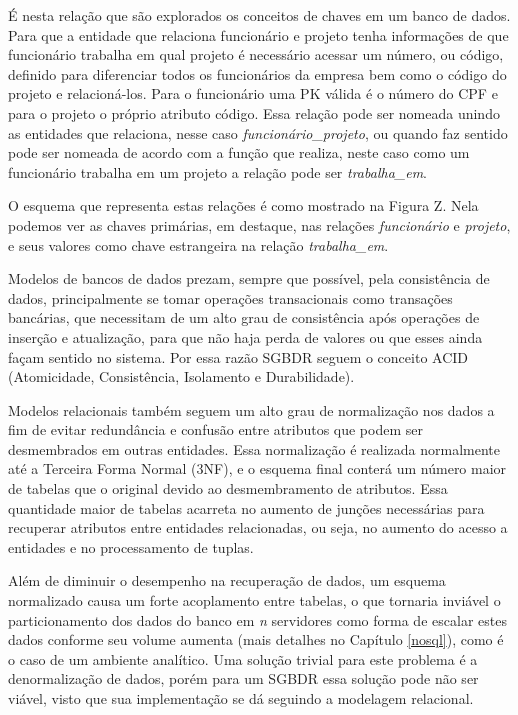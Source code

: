É nesta relação que são explorados os conceitos de chaves em um banco de dados. Para que a entidade que relaciona 
funcionário e projeto tenha informações de que funcionário trabalha em qual projeto é necessário acessar um número, ou código, 
definido para diferenciar todos os funcionários da empresa bem como o código do projeto e relacioná-los. Para o funcionário 
uma PK válida é o número do CPF e para o projeto o próprio atributo código. Essa relação pode ser nomeada unindo 
as entidades que relaciona, nesse caso \textit{funcionário\_projeto}, ou quando faz sentido pode ser nomeada de acordo com a função 
que realiza, neste caso como um funcionário trabalha em um projeto a relação pode ser \textit{trabalha\_em}.

O esquema que representa estas relações é como mostrado na Figura Z. Nela podemos ver as chaves primárias, em destaque, nas relações \textit{funcionário} e \textit{projeto}, e seus valores como chave estrangeira na relação \textit{trabalha\_em}. 

Modelos de bancos de dados prezam, sempre que possível, pela consistência de dados, principalmente se tomar operações transacionais como transações bancárias, que necessitam de um alto grau de consistência após operações de inserção e atualização, para que não haja perda de valores ou que esses ainda façam sentido no sistema. Por essa razão SGBDR seguem o conceito ACID (Atomicidade, Consistência, Isolamento e Durabilidade). 

Modelos relacionais também seguem um alto grau de normalização nos dados a fim de evitar redundância e confusão entre atributos que podem ser desmembrados em outras entidades. Essa normalização é realizada normalmente até a Terceira Forma Normal (3NF), e o esquema final conterá um número maior de tabelas que o original devido ao desmembramento de atributos. Essa quantidade maior de tabelas acarreta no aumento de junções necessárias para recuperar atributos entre entidades relacionadas, ou seja, no aumento do acesso a entidades e no processamento de tuplas.

Além de diminuir o desempenho na recuperação de dados, um esquema normalizado causa um forte acoplamento entre tabelas, o que tornaria inviável o particionamento dos dados do banco em \textit{n} servidores como forma de escalar estes dados conforme seu volume aumenta (mais detalhes no Capítulo \ref{nosql}), como é o caso de um ambiente analítico. Uma solução trivial para este problema é a denormalização de dados, porém para um SGBDR essa solução pode não ser viável, visto que sua implementação se dá seguindo a modelagem relacional.

